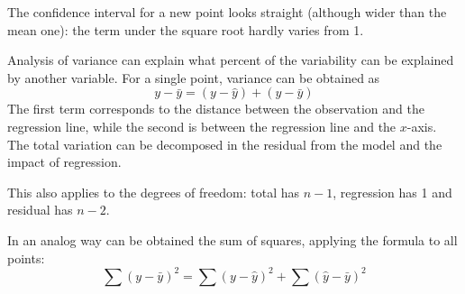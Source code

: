 The confidence interval for a new point looks straight (although wider than the mean one): the term under the square root hardly varies from 1. 

Analysis of variance can explain what percent of the variability can be explained by another variable. For a single point, variance can be obtained as
$$y - \bar{y} = (y - \hat{y}) + (\hat{y} - \bar{y})$$
The first term corresponds to the distance between the observation and the regression line, while the second is between the regression line and the $x$-axis. The total variation can be decomposed in the residual from the model and the impact of regression. 

This also applies to the degrees of freedom: total has $n - 1$, regression has 1 and residual has $n - 2$. 

In an analog way can be obtained the sum of squares, applying the formula to all points:
$$\sum(y - \bar{y})^2 = \sum(y - \hat{y})^2 + \sum(\hat{y} - \bar{y})^2$$




